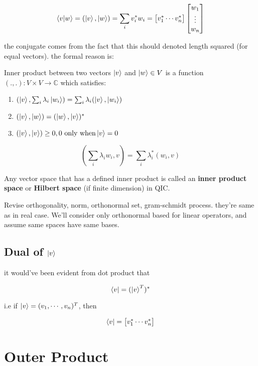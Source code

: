 $$
\braket{v|w} = (\ket{v},\ket{w}) = \sum_i v_i^*w_i = \begin{bmatrix}v_1^* \cdots v_n^*\end{bmatrix}\begin{bmatrix}w_1 \\ \vdots \\ w_n\end{bmatrix}
$$

the conjugate comes from the fact that this should denoted length squared (for equal vectors). the formal reason is:

Inner product between two vectors $\ket{v}$ and $\ket{w} \in V$ is a function $(.,.):V×V\rightarrow \mathbb{C}$ which satisfies:

\begin{enumerate}    
\item $(\ket{v}, \sum_i \lambda_i\ket{w_i}) = \sum_i\lambda_i(\ket{v}, \ket{w_i})$
\item $( \ket{v}, \ket{w} ) = (\ket{w}, \ket{v})^*$
\item $(\ket{v}, \ket{v}) \geq 0, \text{0 only when} \ket{v} = 0$
\end{enumerate}

\begin{equation}
( \sum_i\lambda_iw_i , v) = \sum_i\lambda_i^*(w_i,v)
\end{equation}

Any vector space that has a defined inner product is called an \textbf{inner product space} or \textbf{Hilbert space} (if finite dimension) in QIC.

Revise orthogonality, norm, orthonormal set, gram-schmidt process. they're same as in real case.
We'll consider only orthonormal based for linear operators, and assume same spaces have same bases.

\subsection{Dual of $\ket{v}$}

it would've been evident from dot product that

$$
\bra{v} = (\ket{v}^T)^*
$$

i.e if $\ket{v} = (v_1,\cdots, v_n)^T$, then

$$
\bra{v} = \begin{bmatrix}v_1^* \cdots v_n^*\end{bmatrix}
$$

\section{Outer Product}

